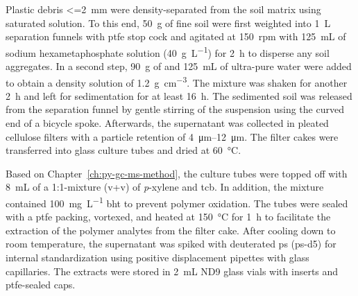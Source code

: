 Plastic debris \SI{<=2}{\milli\meter} were density-separated from the soil matrix using saturated  solution. To this end, \SI{50}{\gram} of fine soil were first weighted into \SI{1}{\liter} separation funnels with \ac{ptfe} stop cock and agitated at \SI{150}{rpm} with \SI{125}{\milli\liter} of sodium hexametaphosphate solution (\SI{40}{\gram\per\liter}) for \SI{2}{\hour} to disperse any soil aggregates. In a second step, \SI{90}{\gram} of  and \SI{125}{\milli\liter} of ultra-pure water were added to obtain a density solution of \SI{1.2}{\gram\per\cubic\centi\meter}. The mixture was shaken for another \SI{2}{\hour} and left for sedimentation for at least \SI{16}{\hour}. The sedimented soil was released from the separation funnel by gentle stirring of the suspension using the curved end of a bicycle spoke. Afterwards, the supernatant was collected in pleated cellulose filters with a particle retention of \SIrange{4}{12}{\micro\meter}. The filter cakes were transferred into glass culture tubes and dried at \SI{60}{\degreeCelsius}.

Based on Chapter~\ref{ch:py-gc-ms-method}, the culture tubes were topped off with \SI{8}{\milli\liter} of a 1:1-mixture (v+v) of \textit{p}-xylene and \ac{tcb}. In addition, the mixture contained \SI{100}{\milli\gram\per\liter} \ac{bht} to prevent polymer oxidation.
The tubes were sealed with a \ac{ptfe} packing, vortexed, and heated at \SI{150}{\degreeCelsius} for \SI{1}{\hour} to facilitate the extraction of the polymer analytes from the filter cake.
After cooling down to room temperature, the supernatant was spiked with deuterated \ac{ps} (\ac{ps}-d5) for internal standardization using positive displacement pipettes with glass capillaries. The extracts were stored in \SI{2}{\milli\liter} ND9 glass vials with inserts and \ac{ptfe}-sealed caps.

